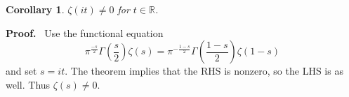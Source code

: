 \documentclass[12pt]{article}
\newcommand{\Reals}{\mathbb{R}}
\newtheorem{cor}{Corollary}
\begin{document}
\begin{cor} $\zeta(it)\neq 0$ for $t\in\Reals$.
\end{cor}

\textbf{Proof. }\ Use the functional equation
\[\pi^{\frac{-s}{2}}\Gamma\left(\frac{s}{2}\right)\zeta(s)=\pi^{-\frac{1-s}{2}}\Gamma\left(\frac{1-s}{2}\right)\zeta(1-s)\]
and set $s=it$. The theorem implies that the RHS is nonzero, so the LHS is as well. Thus $\zeta(s)\ne 0$.


\end{document}
